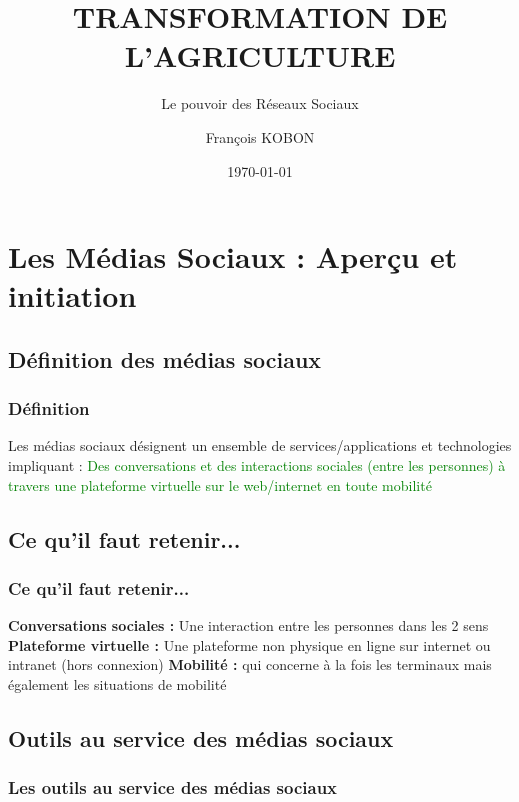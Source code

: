 \documentclass{beamer}
\title[Le pouvoir des Réseaux Sociaux]{TRANSFORMATION DE L’AGRICULTURE}
\subtitle{Le pouvoir des Réseaux Sociaux}
\author{François KOBON}
\institute[FIRCA]
{
Fonds Interprofessionnel pour la Recherche et le Conseil Agricoles \\
\medskip
\textit{fkobon@firca.ci}
}
\date{\today}
\begin{document}
\begin{frame}
\titlepage 
\end{frame}


\section{Les Médias Sociaux : Aperçu et initiation}
 \subsection{Définition des médias sociaux}
  \begin{frame}
   \frametitle{Définition}
   Les médias sociaux désignent un ensemble de services/applications et technologies impliquant :
   \textcolor{green}{Des conversations et des interactions sociales (entre les personnes) à travers une plateforme virtuelle sur le web/internet en toute mobilité}
  \end{frame}
  
  \subsection{Ce qu’il faut retenir...}
   \begin{frame}
    \frametitle{Ce qu'il faut retenir...}
    \textbf{Conversations sociales :} Une interaction entre les personnes dans les 2 sens
    \newline \newline   
    \textbf{Plateforme virtuelle :} Une plateforme non physique en ligne sur internet ou intranet (hors connexion)
    \newline \newline
    \textbf{Mobilité :} qui concerne à la fois les terminaux mais également les situations de mobilité
   \end{frame}

  \subsection{Outils au service des médias sociaux}
   \begin{frame}
    \frametitle{Les outils au service des médias sociaux}
    \begin{center}
    \end{center}
   \end{frame}
\end{document}
